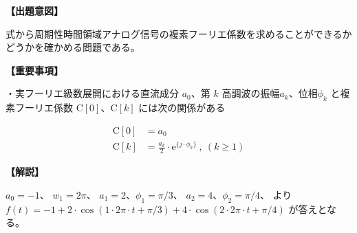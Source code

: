 \noindent \textbf{【出題意図】}

\bigskip
\noindent 式から周期性時間領域アナログ信号の複素フーリエ係数を求めることができるかどうかを確かめる問題である。

\vspace{1em}
\noindent \textbf{【重要事項】}

\medskip
\noindent・実フーリエ級数展開における直流成分 $a_0$、第 $k$ 高調波の振幅$a_k$、位相$\phi_k$ と複素フーリエ係数 $\textrm{C}[0]$、$\textrm{C}[k]$ には次の関係がある

\begin{align*}
\textrm{C}[0] &= a_0 \\
\textrm{C}[k] &= \frac{a_k}{2} \cdot \textrm{e}^{\{j \cdot \phi_k \}} \ ,\ (k\geq 1)
\end{align*}


\bigskip

\vspace{1em}
\noindent \textbf{【解説】}

\bigskip
\noindent 
$a_0 = -1$、
$w_1 = 2 \pi$、
$a_1 = 2$、$\phi_1 = \pi/3$、
$a_2 = 4$、$\phi_2 = \pi/4$、
より 
$f(t) = -1 + 2 \cdot \cos( 1 \cdot 2 \pi \cdot t +\pi/3 ) + 4 \cdot \cos( 2 \cdot 2 \pi \cdot t + \pi/4)$ 
が答えとなる。

